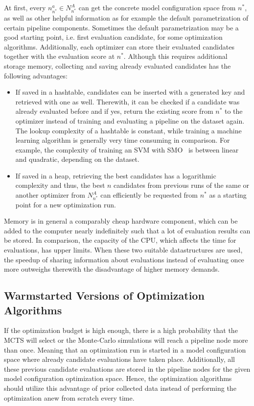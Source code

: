 At first, every $n^{a}_{n^*} \in N^A_{n^*}$ can get the concrete model configuration space from $n^*$, as well as other helpful information as for example the default parametrization of certain pipeline components.
Sometimes the default parametrization may be a good starting point, i.e. first evaluation candidate, for some optimization algorithms.\newline
Additionally, each optimizer can store their evaluated candidates together with the evaluation score at $n^*$.
Although this requires additional storage memory, collecting and saving already evaluated candidates has the following advantages:
\begin{itemize}
    \item If saved in a hashtable, candidates can be inserted with a generated key and retrieved with one as well. Therewith, it can be checked if a candidate was already evaluated before and if yes, return the existing score from $n^*$ to the optimizer instead of training and evaluating a pipeline on the dataset again.
    The lookup complexity of a hashtable is constant, while training a machine learning algorithm is generally very time consuming in comparison.
    For example, the complexity of training an SVM with SMO~\cite{Platt-SMO} is between linear and quadratic, depending on the dataset.
    \item If saved in a heap, retrieving the best candidates has a logarithmic complexity and thus, the best $n$ candidates from previous runs of the same or another optimizer from $N^A_{n^*}$ can efficiently be requested from $n^*$ as a starting point for a new optimization run.
\end{itemize}
Memory is in general a comparably cheap hardware component, which can be added to the computer nearly indefinitely such that a lot of evaluation results can be stored.
In comparison, the capacity of the CPU, which affects the time for evaluations, has upper limits.
When these two suitable datastructures are used, the speedup of sharing information about evaluations instead of evaluating once more outweighs therewith the disadvantage of higher memory demands.

\subsection{Warmstarted Versions of Optimization Algorithms}
\label{sec:approach:configuration:warmstart}
If the optimization budget is high enough, there is a high probability that the MCTS will select or the Monte-Carlo simulations will reach a pipeline node more than once.
Meaning that an optimization run is started in a model configuration space where already candidate evaluations have taken place.
Additionally, all these previous candidate evaluations are stored in the pipeline nodes for the given model configuration optimization space.
Hence, the optimization algorithms should utilize this advantage of prior collected data instead of performing the optimization anew from scratch every time.


